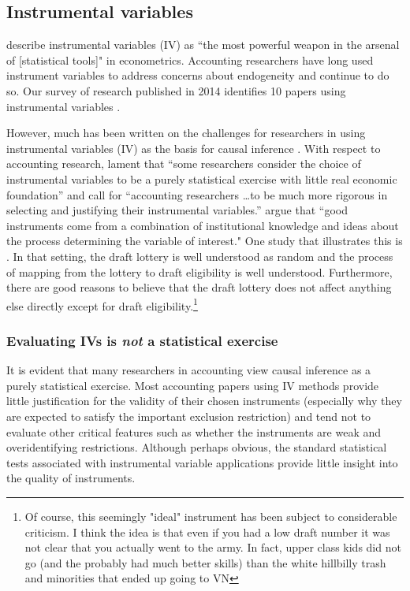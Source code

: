 \documentclass[11pt]{amsart}
\begin{document}
\subsection{Instrumental variables}
\citet[p.114]{Angrist:2008vk} describe instrumental variables (IV) as ``the most powerful weapon in the arsenal of [statistical tools]" in econometrics. 
Accounting researchers have long used instrument variables to address concerns about endogeneity \citep{Larcker:2010fq} and continue to do so.  Our survey of research published in 2014 identifies 10 papers using instrumental variables \citep{Cannon:2014im,Cohen:2014jl,Kim:2014fm,Vermeer:2014bs,Fox:2014io,Guedhami:2013cj,Houston:2014hv,deFranco:2014ct,Erkens:2014hj,Correia:2014fp}. 

However, much has been written on the challenges for researchers in using instrumental variables (IV) as the basis for causal inference \citep[e.g.,][]{Roberts:2013cz}. 
With respect to accounting research, \citet{Larcker:2010fq} lament that ``some researchers consider the choice of instrumental variables to be a purely statistical exercise with little real economic foundation'' and call for 
``accounting researchers \dots to be much more rigorous in selecting and justifying their instrumental variables.'' 
\citet[p.117]{Angrist:2008vk} argue that ``good instruments come from a combination of institutional knowledge and ideas about the process determining the variable of interest."
One study that illustrates this is \cite{Angrist:2008vk}.
In that setting, the draft lottery is well understood as random and the process of mapping from the lottery to draft eligibility is well understood.
Furthermore, there are good reasons to believe that the draft lottery does not affect anything else directly except for draft eligibility.\footnote {Of course, this seemingly "ideal" instrument has been subject to considerable criticism. I think the idea is that even if you had a low draft number it was not clear that you actually went to the army.  In fact, upper class kids did not go (and the probably had much better skills) than the white hillbilly trash and minorities that ended up going to VN}



\subsubsection{Evaluating IVs is \emph{not} a statistical exercise}
It is evident that many researchers in accounting view causal inference as a purely statistical exercise.
Most accounting papers using IV methods provide little justification for the validity of their chosen instruments (especially why they are expected to satisfy the important exclusion restriction) and tend not to evaluate other critical features such as whether the instruments are weak and overidentifying restrictions. Although perhaps obvious, the standard statistical tests associated with instrumental variable applications provide little insight into the quality of instruments.  
\end{document}
